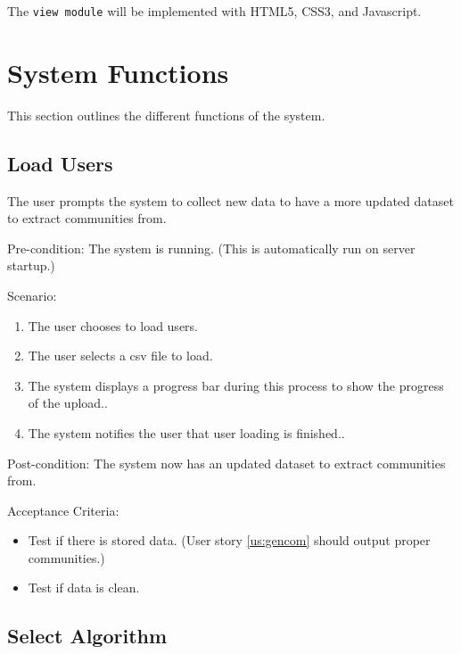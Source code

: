 The \texttt{view module} will be implemented with HTML5, CSS3, and Javascript. 




\section{System Functions}




This section outlines the different functions of the system.




\subsection{Load Users}
\label{us:colldat}




The user prompts the system to collect new data to have a more updated dataset to extract communities from.




Pre-condition: The system is running. (This is automatically run on server startup.)




Scenario:
\begin{enumerate}
\item The user chooses to load users.
\item The user selects a csv file to load.
\item The system displays a progress bar during this process to show the progress of the upload..
\item The system notifies the user that user loading is finished..
\end{enumerate}




Post-condition: The system now has an updated dataset to extract communities from.




Acceptance Criteria:
\begin{itemize}
\item Test if there is stored data. (User story \ref{us:gencom} should output proper communities.)
\item Test if data is clean.
\end{itemize}




\subsection{Select Algorithm}
\label{us:selectalgo}




